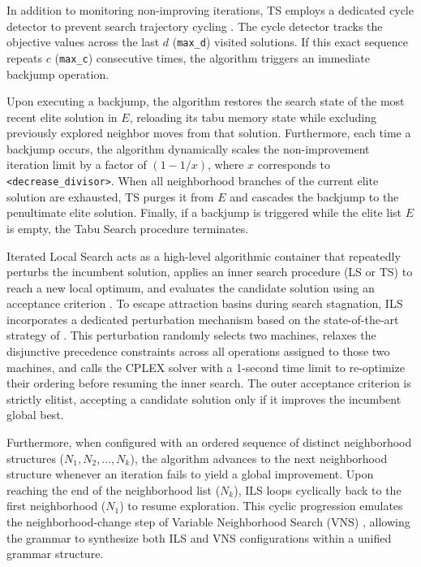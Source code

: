 In addition to monitoring non-improving iterations, TS employs a dedicated cycle detector to prevent search trajectory cycling \citep{zubaran2018effective}.
The cycle detector tracks the objective values across the last $d$ (\texttt{max\_d}) visited solutions.
If this exact sequence repeats $c$ (\texttt{max\_c}) consecutive times, the algorithm triggers an immediate backjump operation.

Upon executing a backjump, the algorithm restores the search state of the most recent elite solution in $E$, reloading its tabu memory state while excluding previously explored neighbor moves from that solution.
Furthermore, each time a backjump occurs, the algorithm dynamically scales the non-improvement iteration limit by a factor of $(1 - 1/x)$, where $x$ corresponds to \texttt{<decrease\_divisor>}.
When all neighborhood branches of the current elite solution are exhausted, TS purges it from $E$ and cascades the backjump to the penultimate elite solution.
Finally, if a backjump is triggered while the elite list $E$ is empty, the Tabu Search procedure terminates.

Iterated Local Search acts as a high-level algorithmic container that repeatedly perturbs the incumbent solution, applies an inner search procedure (LS or TS) to reach a new local optimum, and evaluates the candidate solution using an acceptance criterion \citep{talbi}.
To escape attraction basins during search stagnation, ILS incorporates a dedicated perturbation mechanism based on the state-of-the-art strategy of \citet{ahmadian2021meta}.
This perturbation randomly selects two machines, relaxes the disjunctive precedence constraints across all operations assigned to those two machines, and calls the CPLEX solver with a 1-second time limit to re-optimize their ordering before resuming the inner search.
The outer acceptance criterion is strictly elitist, accepting a candidate solution only if it improves the incumbent global best.

Furthermore, when configured with an ordered sequence of distinct neighborhood structures ($N_1, N_2, \ldots, N_k$), the algorithm advances to the next neighborhood structure whenever an iteration fails to yield a global improvement.
Upon reaching the end of the neighborhood list ($N_k$), ILS loops cyclically back to the first neighborhood ($N_1$) to resume exploration.
This cyclic progression emulates the neighborhood-change step of Variable Neighborhood Search (VNS) \citep{talbi}, allowing the grammar to synthesize both ILS and VNS configurations within a unified grammar structure.

